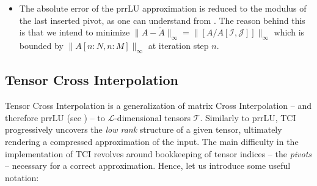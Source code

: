 \begin{itemize}
	\item The absolute error of the prrLU approximation is reduced to the modulus of the last inserted pivot, as one can understand from . The reason behind this is that we intend to minimize $\parallel\! A - \tilde{A}\!\parallel_{\infty} = \parallel\![A/A[\mathcal{I}, \mathcal{J}]] \!\parallel_{\infty}$ which is bounded by $\parallel\! A[n\!:\!N, n\!:\!M]\!\parallel_{\infty}$ at iteration step $n$.  
\end{itemize}


\subsection{Tensor Cross Interpolation}

Tensor Cross Interpolation is a generalization of matrix Cross Interpolation -- and therefore prrLU (see ) -- to $\mathcal{L}$-dimensional tensors $\mathcal{T}$. Similarly to prrLU, TCI progressively uncovers the \textit{low rank} structure of a given tensor, ultimately rendering a compressed approximation of the input. The main difficulty in the implementation of TCI revolves around bookkeeping of tensor indices -- the \textit{pivots} -- necessary for a correct approximation. 
Hence, let us introduce some useful notation: 
